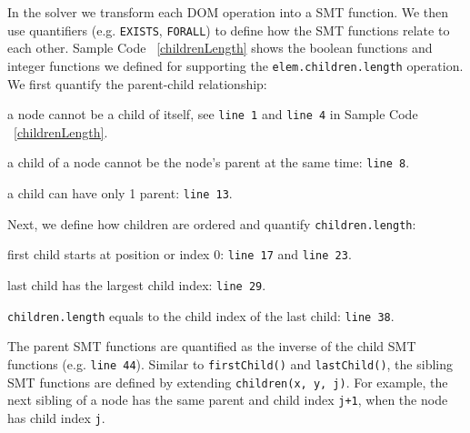In the solver we transform each DOM operation into a SMT function.  We then use quantifiers (e.g. {\tt EXISTS}, {\tt FORALL}) to define how the SMT functions relate to each other.  
Sample Code ~\ref{childrenLength} shows the boolean functions and integer functions we defined for supporting the {\tt elem.children.length} operation.  We first quantify the parent-child relationship: 
\begin{compactitem} 
\item a node cannot be a child of itself, see {\tt line 1} and {\tt line 4} in Sample Code ~\ref{childrenLength}.
\item a child of a node cannot be the node's parent at the same time: {\tt line 8}.
\item a child can have only 1 parent: {\tt line 13}.
\end{compactitem}
Next, we define how children are ordered and quantify {\tt children.length}:
\begin{compactitem} 
\item first child starts at position or index 0: {\tt line 17} and {\tt line 23}.
\item last child has the largest child index: {\tt line 29}.
\item {\tt children.length} equals to the child index of the last child: {\tt line 38}.
\end{compactitem}
The parent SMT functions are quantified as the inverse of the child SMT functions (e.g. {\tt line 44}).  Similar to {\tt firstChild()} and {\tt lastChild()}, the sibling SMT functions are defined by extending {\tt children(x, y, j)}.  
For example, the next sibling of a node has the same parent and child index {\tt j+1}, when the node has child index {\tt j}.

